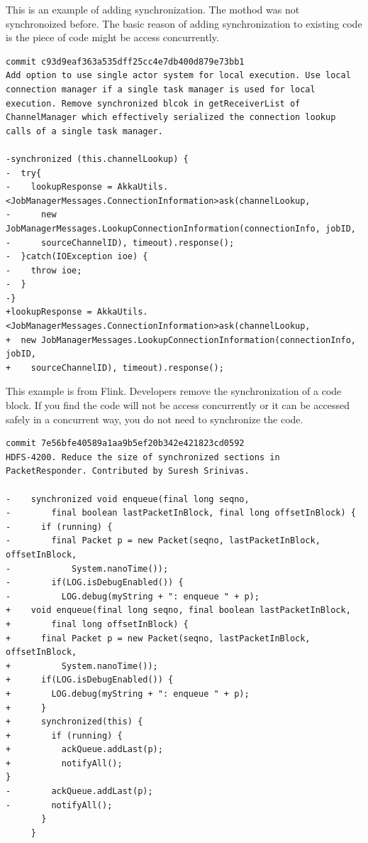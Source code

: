 This is an example of adding synchronization. The mothod was not synchronoized before. The basic reason of adding synchronization to existing code is the piece of code might be access concurrently.

\begin{lstlisting}
commit c93d9eaf363a535dff25cc4e7db400d879e73bb1
Add option to use single actor system for local execution. Use local connection manager if a single task manager is used for local execution. Remove synchronized blcok in getReceiverList of ChannelManager which effectively serialized the connection lookup calls of a single task manager.

-synchronized (this.channelLookup) {
-  try{
-    lookupResponse = AkkaUtils.<JobManagerMessages.ConnectionInformation>ask(channelLookup,
-      new JobManagerMessages.LookupConnectionInformation(connectionInfo, jobID,
-      sourceChannelID), timeout).response();
-  }catch(IOException ioe) {
-    throw ioe;
-  }
-}
+lookupResponse = AkkaUtils.<JobManagerMessages.ConnectionInformation>ask(channelLookup,
+  new JobManagerMessages.LookupConnectionInformation(connectionInfo, jobID,
+    sourceChannelID), timeout).response();
\end{lstlisting}

This example is from Flink. Developers remove the synchronization of a code block. If you find the code will not be access concurrently or it can be accessed safely in a concurrent way, you do not need to synchronize the code.

\begin{lstlisting}
commit 7e56bfe40589a1aa9b5ef20b342e421823cd0592
HDFS-4200. Reduce the size of synchronized sections in PacketResponder. Contributed by Suresh Srinivas.

-    synchronized void enqueue(final long seqno,
-        final boolean lastPacketInBlock, final long offsetInBlock) {
-      if (running) {
-        final Packet p = new Packet(seqno, lastPacketInBlock, offsetInBlock,
-            System.nanoTime());
-        if(LOG.isDebugEnabled()) {
-          LOG.debug(myString + ": enqueue " + p);
+    void enqueue(final long seqno, final boolean lastPacketInBlock,
+        final long offsetInBlock) {
+      final Packet p = new Packet(seqno, lastPacketInBlock, offsetInBlock,
+          System.nanoTime());
+      if(LOG.isDebugEnabled()) {
+        LOG.debug(myString + ": enqueue " + p);
+      }
+      synchronized(this) {
+        if (running) {
+          ackQueue.addLast(p);
+          notifyAll();
}
-        ackQueue.addLast(p);
-        notifyAll();
       }
     }
\end{lstlisting}

